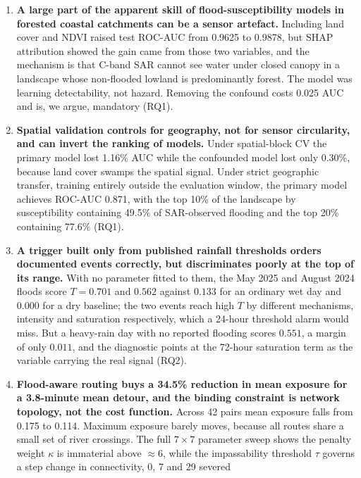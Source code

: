 \documentclass[11pt,a4paper]{article}
\begin{document}
\begin{enumerate}
\itemsep3pt
\item \textbf{A large part of the apparent skill of flood-susceptibility models
      in forested coastal catchments can be a sensor artefact.} Including land
      cover and NDVI raised test ROC-AUC from 0.9625 to 0.9878, but SHAP
      attribution showed the gain came from those two variables, and the
      mechanism is that C-band SAR cannot see water under closed canopy in a
      landscape whose non-flooded lowland is predominantly forest. The model was
      learning detectability, not hazard. Removing the confound costs 0.025 AUC
      and is, we argue, mandatory (RQ1).
\item \textbf{Spatial validation controls for geography, not for sensor
      circularity, and can invert the ranking of models.} Under spatial-block CV
      the primary model lost 1.16\% AUC while the confounded model lost only
      0.30\%, because land cover swamps the spatial signal. Under strict
      geographic transfer, training entirely outside the evaluation window, the
      primary model achieves ROC-AUC 0.871, with the top 10\% of the landscape by
      susceptibility containing 49.5\% of SAR-observed flooding and the top 20\%
      containing 77.6\% (RQ1).
\item \textbf{A trigger built only from published rainfall thresholds orders
      documented events correctly, but discriminates poorly at the top of its
      range.} With no parameter fitted to them, the May 2025 and August 2024
      floods score $T=0.701$ and $0.562$ against $0.133$ for an ordinary wet day
      and $0.000$ for a dry baseline; the two events reach high $T$ by different
      mechanisms, intensity and saturation respectively, which a 24-hour
      threshold alarm would miss. But a heavy-rain day with no reported flooding
      scores $0.551$, a margin of only $0.011$, and the diagnostic points at the
      72-hour saturation term as the variable carrying the real signal (RQ2).
\item \textbf{Flood-aware routing buys a 34.5\% reduction in mean exposure for a
      3.8-minute mean detour, and the binding constraint is network topology, not
      the cost function.} Across 42 pairs mean exposure falls from 0.175 to
      0.114. Maximum exposure barely moves, because all routes share a small set
      of river crossings. The full $7\times7$ parameter sweep shows the penalty
      weight $\kappa$ is immaterial above $\approx6$, while the impassability
      threshold $\tau$ governs a step change in connectivity, 0, 7 and 29 severed

\end{enumerate}
\end{document}
